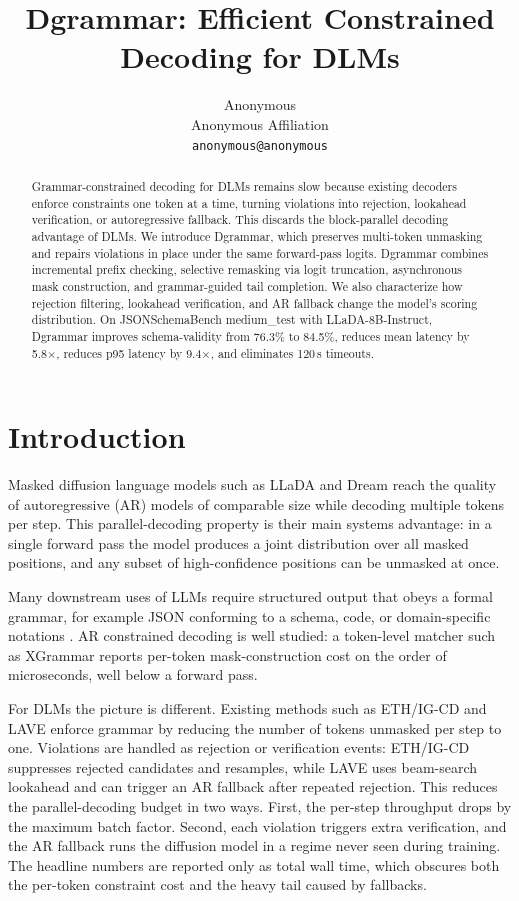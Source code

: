 \documentclass[11pt]{article}
\title{Dgrammar: Efficient Constrained Decoding for DLMs}
\author{Anonymous \\
  Anonymous Affiliation \\
  \texttt{anonymous@anonymous} \\}
\begin{document}
\maketitle

\begin{abstract}
Grammar-constrained decoding for DLMs remains slow because existing decoders enforce constraints one token at a time, turning violations into rejection, lookahead verification, or autoregressive fallback. This discards the block-parallel decoding advantage of DLMs. We introduce Dgrammar, which preserves multi-token unmasking and repairs violations in place under the same forward-pass logits. Dgrammar combines incremental prefix checking, selective remasking via logit truncation, asynchronous mask construction, and grammar-guided tail completion. We also characterize how rejection filtering, lookahead verification, and AR fallback change the model's scoring distribution. On JSONSchemaBench medium\_test with LLaDA-8B-Instruct, Dgrammar improves schema-validity from 76.3\% to 84.5\%, reduces mean latency by 5.8$\times$, reduces p95 latency by 9.4$\times$, and eliminates 120\,s timeouts.
\end{abstract}

\section{Introduction}

Masked diffusion language models such as LLaDA \citep{llada2025} and Dream \citep{dream2025} reach the quality of autoregressive (AR) models of comparable size while decoding multiple tokens per step. This parallel-decoding property is their main systems advantage: in a single forward pass the model produces a joint distribution over all masked positions, and any subset of high-confidence positions can be unmasked at once.

Many downstream uses of LLMs require structured output that obeys a formal grammar, for example JSON conforming to a schema, code, or domain-specific notations \citep{willard2023outlines,xgrammar2024}. AR constrained decoding is well studied: a token-level matcher such as XGrammar reports per-token mask-construction cost on the order of microseconds, well below a forward pass.

For DLMs the picture is different. Existing methods such as ETH/IG-CD \citep{mundler2025} and LAVE \citep{lave2025} enforce grammar by reducing the number of tokens unmasked per step to one. Violations are handled as rejection or verification events: ETH/IG-CD suppresses rejected candidates and resamples, while LAVE uses beam-search lookahead and can trigger an AR fallback after repeated rejection. This reduces the parallel-decoding budget in two ways. First, the per-step throughput drops by the maximum batch factor. Second, each violation triggers extra verification, and the AR fallback runs the diffusion model in a regime never seen during training. The headline numbers are reported only as total wall time, which obscures both the per-token constraint cost and the heavy tail caused by fallbacks.
\end{document}
